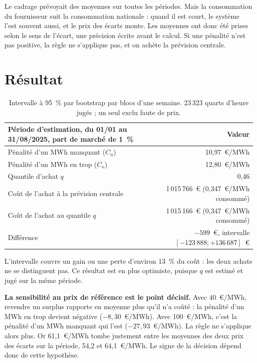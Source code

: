 \documentclass[11pt,a4paper]{article}
\begin{document}
Le cadrage prévoyait des moyennes sur toutes les périodes. Mais la consommation du fournisseur suit la consommation nationale : quand il est court, le système l'est souvent aussi, et le prix des écarts monte. Les moyennes ont donc été prises selon le sens de l'écart, une précision écrite avant le calcul. Si une pénalité n'est pas positive, la règle ne s'applique pas, et on achète la prévision centrale.

\section{Résultat}

\begin{table}[H]
\small
\begin{tabularx}{\linewidth}{Yr}
\toprule
\textbf{Période d'estimation, du 01/01 au 31/08/2025, part de marché de 1~\%} & \textbf{Valeur} \\
\midrule
Pénalité d'un MWh manquant ($C_u$) & 10,97~€/MWh \\
Pénalité d'un MWh en trop ($C_o$) & 12,80~€/MWh \\
Quantile d'achat $q$ & 0,46 \\
Coût de l'achat à la prévision centrale & 1\,015\,766~€ (0,347~€/MWh consommé) \\
Coût de l'achat au quantile $q$ & 1\,015\,166~€ (0,347~€/MWh consommé) \\
Différence & $-599$~€, intervalle $[-123\,888 ; +136\,687]$~€ \\
\bottomrule
\end{tabularx}
\caption{Intervalle à 95~\% par bootstrap par blocs d'une semaine. 23\,323 quarts d'heure jugés ; un seul exclu faute de prix.}
\end{table}

L'intervalle couvre un gain ou une perte d'environ 13~\% du coût : les deux achats ne se distinguent pas. Ce résultat est en plus optimiste, puisque $q$ est estimé et jugé sur la même période.

\textbf{La sensibilité au prix de référence est le point décisif.} Avec 40~€/MWh, revendre un surplus rapporte en moyenne plus qu'il n'a coûté : la pénalité d'un MWh en trop devient négative ($-8{,}30$~€/MWh). Avec 100~€/MWh, c'est la pénalité d'un MWh manquant qui l'est ($-27{,}93$~€/MWh). La règle ne s'applique alors plus. Or 61,1~€/MWh tombe justement entre les moyennes des deux prix des écarts sur la période, 54,2 et 64,1~€/MWh. Le signe de la décision dépend donc de cette hypothèse.
\end{document}
